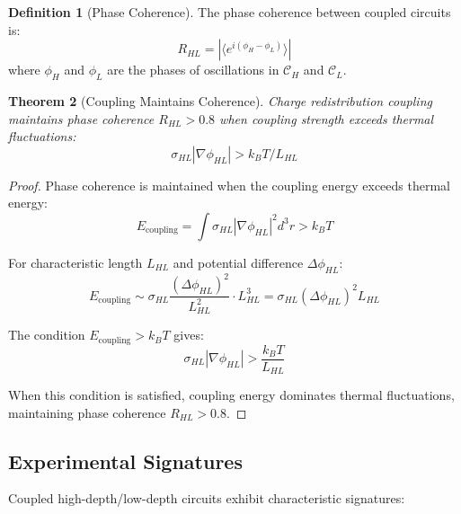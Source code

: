 \documentclass[12pt,a4paper]{article}
\theoremstyle{plain}
\newtheorem{theorem}{Theorem}[section]
\theoremstyle{definition}
\newtheorem{definition}[theorem]{Definition}
\theoremstyle{remark}
\begin{document}
\begin{definition}[Phase Coherence]
\label{def:phase_coherence}
The phase coherence between coupled circuits is:
\begin{equation}
R_{HL} = \left| \langle e^{i(\phi_H - \phi_L)} \rangle \right|
\end{equation}
where $\phi_H$ and $\phi_L$ are the phases of oscillations in $\mathcal{C}_H$ and $\mathcal{C}_L$.
\end{definition}

\begin{theorem}[Coupling Maintains Coherence]
\label{thm:coupling_coherence}
Charge redistribution coupling maintains phase coherence $R_{HL} > 0.8$ when coupling strength exceeds thermal fluctuations:
\begin{equation}
\sigma_{HL} |\nabla \phi_{HL}| > k_B T / L_{HL}
\end{equation}
\end{theorem}

\begin{proof}
Phase coherence is maintained when the coupling energy exceeds thermal energy:
\begin{equation}
E_{\text{coupling}} = \int \sigma_{HL} |\nabla \phi_{HL}|^2 d^3r > k_B T
\end{equation}

For characteristic length $L_{HL}$ and potential difference $\Delta \phi_{HL}$:
\begin{equation}
E_{\text{coupling}} \sim \sigma_{HL} \frac{(\Delta \phi_{HL})^2}{L_{HL}^2} \cdot L_{HL}^3 = \sigma_{HL} (\Delta \phi_{HL})^2 L_{HL}
\end{equation}

The condition $E_{\text{coupling}} > k_B T$ gives:
\begin{equation}
\sigma_{HL} |\nabla \phi_{HL}| > \frac{k_B T}{L_{HL}}
\end{equation}

When this condition is satisfied, coupling energy dominates thermal fluctuations, maintaining phase coherence $R_{HL} > 0.8$.
\end{proof}

\subsection{Experimental Signatures}

Coupled high-depth/low-depth circuits exhibit characteristic signatures:
\end{document}
